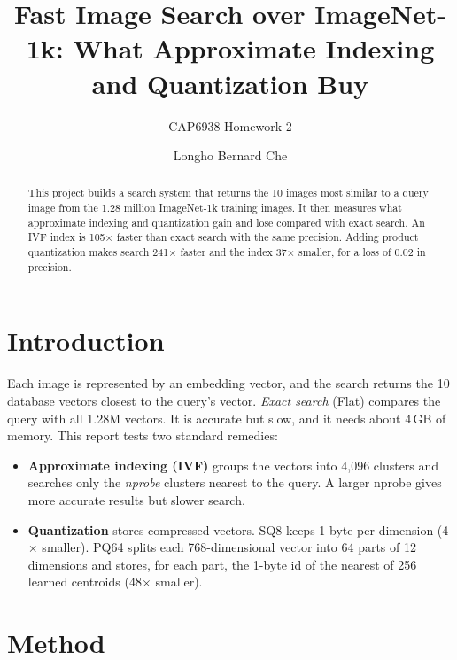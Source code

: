 \documentclass[sigconf,nonacm,pbalance]{acmart}
\begin{document}
\title{Fast Image Search over ImageNet-1k: What Approximate Indexing and Quantization Buy}
\subtitle{CAP6938 Homework 2}

\author{Longho Bernard Che}

\begin{abstract}
This project builds a search system that returns the 10 images most similar to a query image from the 1.28 million ImageNet-1k
training images. It then measures what approximate indexing and quantization gain and lose compared with exact search. An IVF index
is 105$\times$ faster than exact search with the same precision. Adding product quantization makes search 241$\times$ faster and the index
37$\times$ smaller, for a loss of 0.02 in precision.
\end{abstract}

\maketitle

\section{Introduction}

Each image is represented by an embedding vector, and the search returns the 10 database vectors closest to the query's vector.
\emph{Exact search} (Flat) compares the query with all 1.28M vectors. It is accurate but slow, and it needs about 4\,GB of memory. This
report tests two standard remedies:
\begin{itemize}[nosep,leftmargin=*]
  \item \textbf{Approximate indexing (IVF)} groups the vectors into 4{,}096 clusters and searches only the \emph{nprobe} clusters nearest to the
  query. A larger nprobe gives more accurate results but slower search.
  \item \textbf{Quantization} stores compressed vectors. SQ8 keeps 1 byte per dimension (4$\times$ smaller). PQ64 splits each 768-dimensional vector into 64 parts
  of 12 dimensions and stores, for each part, the 1-byte id of the nearest of 256 learned centroids (48$\times$ smaller).
\end{itemize}

\section{Method}
\end{document}
